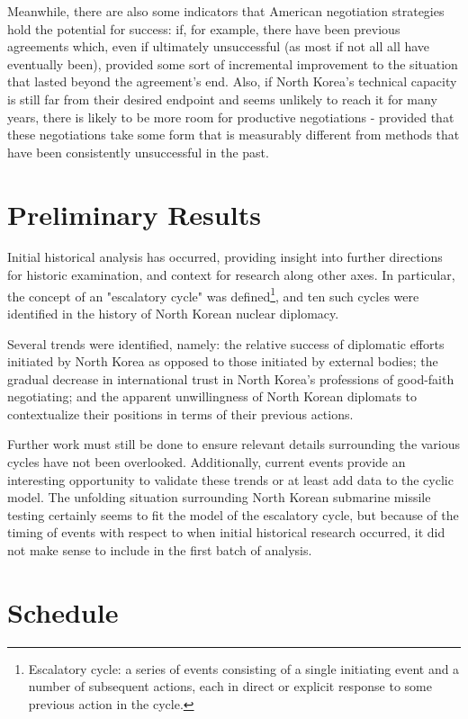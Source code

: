 \documentclass[titlepage]{article}
\begin{document}
Meanwhile, there are also some indicators that American negotiation strategies hold the potential for success: if, for example, there have been previous agreements which, even if ultimately unsuccessful (as most if not all all have eventually been), provided some sort of incremental improvement to the situation that lasted beyond the agreement's end. Also, if North Korea's technical capacity is still far from their desired endpoint and seems unlikely to reach it for many years, there is likely to be more room for productive negotiations - provided that these negotiations take some form that is measurably different from methods that have been consistently unsuccessful in the past.


\section{Preliminary Results}
Initial historical analysis has occurred, providing insight into further directions for historic examination, and context for research along other axes. In particular, the concept of an "escalatory cycle" was defined\footnote{Escalatory cycle: a series of events consisting of a single initiating event and a number of subsequent actions, each in direct or explicit response to some previous action in the cycle.}, and ten such cycles were identified in the history of North Korean nuclear diplomacy.

Several trends were identified, namely: the relative success of diplomatic efforts initiated by North Korea as opposed to those initiated by external bodies; the gradual decrease in international trust in North Korea's professions of good-faith negotiating; and the apparent unwillingness of North Korean diplomats to contextualize their positions in terms of their previous actions.

Further work must still be done to ensure relevant details surrounding the various cycles have not been overlooked. Additionally, current events provide an interesting opportunity to validate these trends or at least add data to the cyclic model. The unfolding situation surrounding North Korean submarine missile testing certainly seems to fit the model of the escalatory cycle, but because of the timing of events with respect to when initial historical research occurred, it did not make sense to include in the first batch of analysis.

\section{Schedule}
\end{document}
